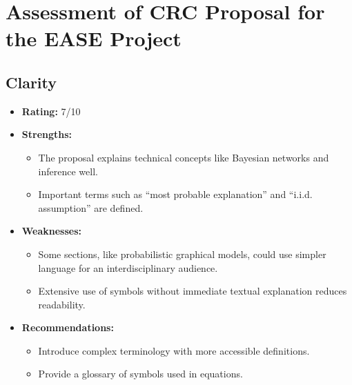 \documentclass{article}
\begin{document}
\section{Assessment of CRC Proposal for the EASE Project}

\subsection{Clarity}
\begin{itemize}
    \item \textbf{Rating:} 7/10
    \item \textbf{Strengths:}
        \begin{itemize}
            \item The proposal explains technical concepts like Bayesian networks and inference well.
            \item Important terms such as ``most probable explanation'' and ``i.i.d. assumption'' are defined.
        \end{itemize}
    \item \textbf{Weaknesses:}
        \begin{itemize}
            \item Some sections, like probabilistic graphical models, could use simpler language for an interdisciplinary audience.
            \item Extensive use of symbols without immediate textual explanation reduces readability.
        \end{itemize}
    \item \textbf{Recommendations:}
        \begin{itemize}
            \item Introduce complex terminology with more accessible definitions.
            \item Provide a glossary of symbols used in equations.
        \end{itemize}
\end{itemize}
\end{document}
